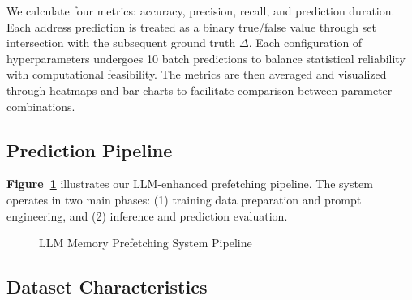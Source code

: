 \documentclass[sigconf,authorversion,nonacm]{acmart}
\begin{document}
We calculate four metrics: accuracy, precision, recall, and prediction duration. Each address prediction is treated as a binary true/false value through set intersection with the subsequent ground truth $\Delta$. Each configuration of hyperparameters undergoes 10 batch predictions to balance statistical reliability with computational feasibility. The metrics are then averaged and visualized through heatmaps and bar charts to facilitate comparison between parameter combinations.
\subsection{Prediction Pipeline}

\textbf{Figure~\ref{fig:pipeline}} illustrates our LLM-enhanced prefetching pipeline. The system operates in two main phases: (1) training data preparation and prompt engineering, and (2) inference and prediction evaluation.


\begin{figure}[t]
\centering
{}
\caption{LLM Memory Prefetching System Pipeline}
\label{fig:pipeline}
\end{figure}

\subsection{Dataset Characteristics}
\end{document}
